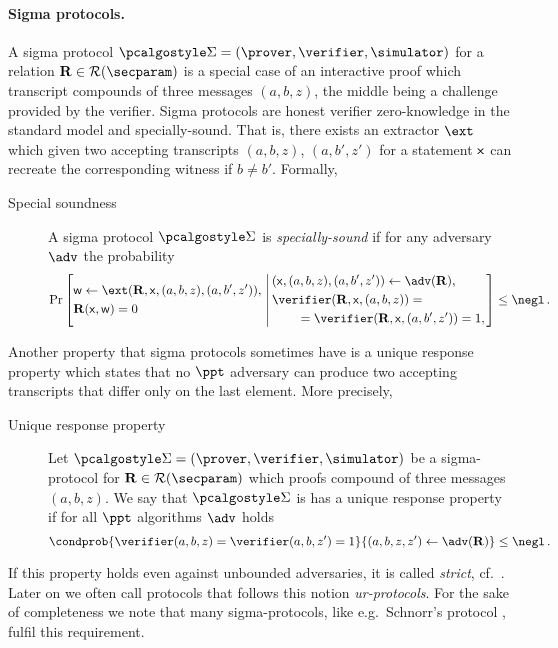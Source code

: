 \let\accentvec\vec \documentclass[runningheads]{llncs}
\begin{document}
\paragraph{Sigma protocols.}
A sigma protocol $\sigmaprot = (\prover, \verifier, \simulator)$ for a relation
$\REL \in \RELGEN(\secparam)$ is a special case of an interactive proof which
transcript compounds of three messages $(a, b, z)$, the middle being a challenge
provided by the verifier. Sigma protocols are honest verifier zero-knowledge in
the standard model and specially-sound. That is, there exists an extractor
$\ext$ which given two accepting transcripts $(a, b, z)$, $(a, b', z')$ for a
statement $\mathsf{x}$ can recreate the corresponding witness if $b \neq b'$.
Formally,
\begin{description}
	\item[Special soundness] A sigma protocol $\sigmaprot$ is \emph{specially-sound} if for any adversary $\adv$ the probability
	\[
		\Pr\left[
		\begin{aligned}
				& \wit \gets \ext(\REL, \inp, (a, b, z), (a, b', z')),\\
				& \REL(\inp, \wit) = 0
		\end{aligned}
		\,\left|\,
		\begin{aligned}
			& (\inp, (a, b, z), (a, b', z')) \gets \adv(\REL), \\
			& \verifier(\REL, \inp, (a, b, z)) = \\
			& \qquad = \verifier(\REL, \inp, (a, b', z')) = 1, \\
		\end{aligned}
		\right.\right] \leq  \negl\,.
	\]
\end{description}

Another property that sigma protocols sometimes have is a unique response
property \cite{C:Fischlin05} which states that no $\ppt$ adversary can produce
two accepting transcripts that differ only on the last element. More precisely,
\begin{description}
\item[Unique response property] Let $\sigmaprot = (\prover, \verifier,
  \simulator)$ be a sigma-protocol for $\REL \in \RELGEN(\secparam)$ which
  proofs compound of three messages $(a, b, z)$. We say that $\sigmaprot$ is has
  a unique response property if for all $\ppt$ algorithms $\adv$ holds
			\[
				\condprob{\verifier (a, b, z) = \verifier (a, b, z')  = 1}{(a, b, z,
				z') \gets \adv(\REL)} \leq \negl\,.
			\]
\end{description}
If this property holds even against unbounded adversaries, it is called
\emph{strict}, cf.~\cite{INDOCRYPT:FKMV12}. Later on we often call protocols
that follows this notion \emph{ur-protocols}. For the sake of completeness we
note that many sigma-protocols, like e.g.~Schnorr's protocol \cite{C:Schnorr89},
fulfil this requirement.
\end{document}
